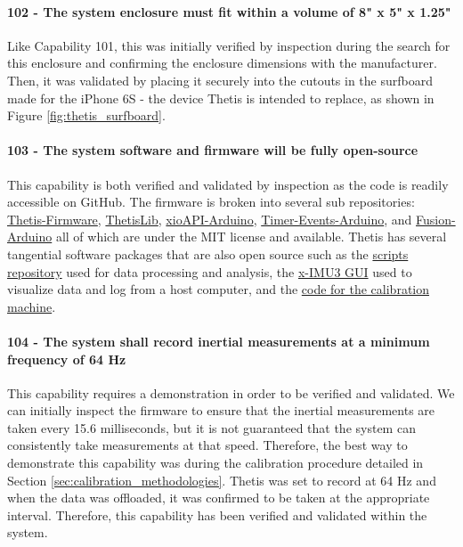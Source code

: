 \paragraph*{102 - The system enclosure must fit within a volume of 8" x 5" x 1.25"} Like Capability 101, this was initially verified by inspection during the search for this enclosure and confirming the enclosure dimensions with the manufacturer.
Then, it was validated by placing it securely into the cutouts in the surfboard made for the iPhone 6S - the device Thetis is intended to replace, as shown in Figure \ref{fig:thetis_surfboard}.

\paragraph*{103 - The system software and firmware will be fully open-source} This capability is both verified and validated by inspection as the code is readily accessible on GitHub.
The firmware is broken into several sub repositories: \href{https://github.com/Legohead259/Thetis-Firmware}{Thetis-Firmware}, \href{https://github.com/Legohead259/ThetisLib}{ThetisLib}, \href{https://github.com/Legohead259/xioAPI-Arduino}{xioAPI-Arduino}, \href{https://github.com/Legohead259/Timer-Events-Arduino}{Timer-Events-Arduino}, and \href{https://github.com/Legohead259/Fusion-Arduino}{Fusion-Arduino} all of which are under the MIT license and available.
Thetis has several tangential software packages that are also open source such as the \href{https://github.com/Legohead259/Thetis-Scripts}{scripts repository} used for data processing and analysis, the \href{https://github.com/xioTechnologies/x-IMU3-Software}{x-IMU3 GUI} used to visualize data and log from a host computer, and the \href{https://github.com/Legohead259/Thetis-Calibration}{code for the calibration machine}.

\paragraph*{104 - The system shall record inertial measurements at a minimum frequency of 64 Hz} This capability requires a demonstration in order to be verified and validated.
We can initially inspect the firmware to ensure that the inertial measurements are taken every 15.6 milliseconds, but it is not guaranteed that the system can consistently take measurements at that speed.
Therefore, the best way to demonstrate this capability was during the calibration procedure detailed in Section \ref{sec:calibration_methodologies}.
Thetis was set to record at 64 Hz and when the data was offloaded, it was confirmed to be taken at the appropriate interval.
Therefore, this capability has been verified and validated within the system.

